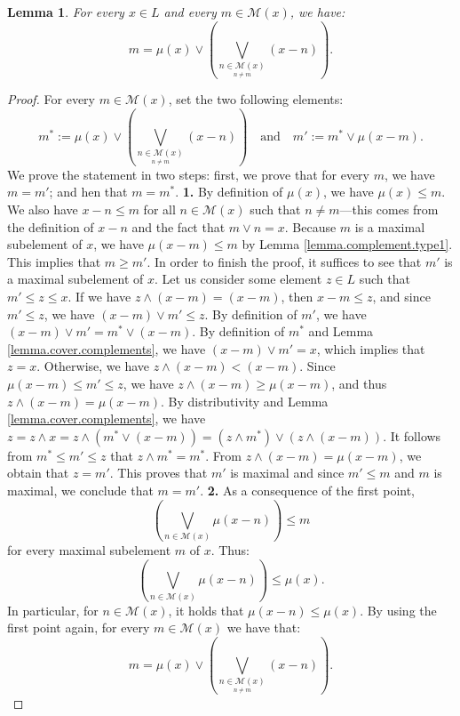 \documentclass{article}
\newtheorem{lemma}[theorem]{Lemma}
\begin{document}
\begin{lemma}\label{lemma.formula.maximal}
    For every $x \in L$ and every $m \in \mathcal{M}(x)$, we have: 
    \[m = \mu(x) \vee \left(\underset{\underset{n \neq m}{n \in \mathcal{M}(x)}}{\bigvee} (x-n)\right).\]
\end{lemma}

\begin{proof} For every $m \in \mathcal{M}(x)$, 
set the two following elements: 
 \[m^* := \mu(x) \vee \left(\underset{\underset{n \neq m}{n \in \mathcal{M}(x)}}{\bigvee} (x-n)\right) \quad \text{and} \quad m' := m^* \vee \mu(x-m).\]
 We prove the statement in two steps: first, we prove that for every $m$, we have $m = m'$; and hen that $m=m^*$.
 \textbf{1.} 
    By definition of $\mu(x)$, we have $\mu(x) \le m$. We also have $x-n \le m $ for all $n \in \mathcal{M}(x)$ such that $n \neq m$---this comes from the definition of $x-n$ and the fact that $m \vee n = x$. Because $m$ is a maximal subelement of $x$, we have $ \mu(x-m) \le m$ by Lemma \ref{lemma.complement.type1}. This implies that $m \ge m'$. In order to finish the proof, it suffices to see that $m'$ is a maximal subelement of $x$. Let us consider some element $z \in L$ such that $m' \le z \le x$.
    If we have $z \wedge (x-m) = (x-m)$, then $x-m \le z$, and since $m' \le z$, we have $(x-m) \vee m' \le z$.
    By definition of $m'$, we have 
    $(x-m)\vee m' = m^* \vee (x-m)$. By definition of $m^*$ and Lemma \ref{lemma.cover.complements}, 
    we have $(x-m) \vee m' = x$, which implies that $z = x$. Otherwise, 
    we have $z \wedge (x-m) < (x-m)$. 
    Since $\mu(x-m) \le m' \le z$, 
    we have $z \wedge (x-m) \ge \mu(x-m)$, and thus $z \wedge (x-m) = \mu(x-m)$. By distributivity and Lemma \ref{lemma.cover.complements}, we have $z = z \wedge x = z \wedge (m^* \vee (x-m)) = (z \wedge m^*)\vee (z \wedge (x-m))$. 
    It follows from $m^* \le m' \le z$ that $z \wedge m^* = m^*$. From $z \wedge (x-m) = \mu(x-m)$, we obtain that $z = m'$. This proves that $m'$ is maximal and since $m' \le m$ and $m$ is maximal, we conclude that $m = m'$. \noindent \textbf{2.} As a consequence of the first point,
    \[\left(\underset{{n \in \mathcal{M}(x)}}{\bigvee} \mu(x-n)\right) \le m\]
    for every maximal subelement \(m\) of $x$. Thus: 
    \[\left(\underset{{n \in \mathcal{M}(x)}}{\bigvee} \mu(x-n)\right) \le \mu(x).\]
    In particular, for $n \in \mathcal{M}(x)$, it holds that $\mu(x-n) \le \mu(x)$. By using the first point again, for every $m \in \mathcal{M}(x)$ we have that: 
    \[m = \mu(x) \vee \left(\underset{\underset{n \neq m}{n \in \mathcal{M}(x)}}{\bigvee} (x-n)\right).\]
\end{proof}
\end{document}
